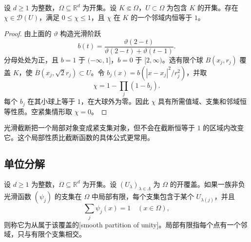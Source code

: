 \begin{lemma}\label{b1:lem:smooth-cutoff}
设 \(d\geq1\) 为整数，\(\Omega\subseteq\mathbb R^d\) 为开集。设 \(K\Subset\Omega\)，\(U\subset\Omega\) 为包含 \(K\) 的开集。存在 \(\chi\in\mathcal D(U)\)，满足 \(0\leq\chi\leq1\)，且 \(\chi\) 在 \(K\) 的一个邻域内恒等于 \(1\)。
\end{lemma}
\begin{proof}
由上面的 \(\vartheta\) 构造光滑阶跃
\[
 b(t)=\frac{\vartheta(2-t)}{\vartheta(2-t)+\vartheta(t-1)}.
\]
分母处处为正，且 \(b=1\) 于 \((-\infty,1]\)，\(b=0\) 于 \([2,\infty)\)。选有限个球 \(B(x_j,r_j)\) 覆盖 \(K\)，使 \(\overline B(x_j,\sqrt2r_j)\subset U\)。令 \(b_j(x)=b(|x-x_j|^2/r_j^2)\)，并取
\[
 \chi=1-\prod_j(1-b_j).
\]
每个 \(b_j\) 在其小球上等于 \(1\)，在大球外为零。因此 \(\chi\) 具有所需值域、支集和邻域恒等性质。空紧集情形取 \(\chi=0\)。
\end{proof}

光滑截断把一个局部对象变成紧支集对象，但不会在截断恒等于 \(1\) 的区域内改变它。这个局部性质比截断函数的具体公式更常用。

\subsection{单位分解}
\label{b1:subsec:200103}

\begin{definition}\label{b1:def:smooth-partition-unity}
设 \(d\geq1\) 为整数，\(\Omega\subseteq\mathbb R^d\) 为开集。设 \((U_\lambda)_{\lambda\in\Lambda}\) 为 \(\Omega\) 的开覆盖。如果一族非负光滑函数 \((\psi_j)\) 的支集在 \(\Omega\) 中局部有限，每个支集包含于某个 \(U_{\lambda(j)}\)，并且
\[
 \sum_j\psi_j(x)=1\quad(x\in\Omega),
\]
则称它为从属于该覆盖的[smooth partition of unity]。局部有限指每个点有一个邻域，只与有限个支集相交。
\end{definition}

